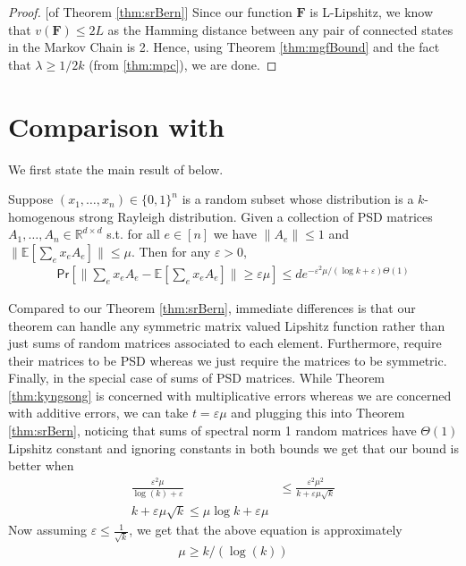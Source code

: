 \begin{proof}{[of Theorem \ref{thm:srBern}]} Since our function $\mathbf{F}$ is L-Lipshitz, we know that $v(\mathbf{F})\leq 2L$ as the Hamming distance between any pair of connected states in the Markov Chain is 2. Hence, using Theorem \ref{thm:mgfBound} and the fact that $\lambda\geq1/{2k}$ (from \ref{thm:mpc}), we are done.
\end{proof}
\section{Comparison with \cite{KyngSong18}}\label{sec:ks}
We first state the main result of \cite{KyngSong18} below.
\begin{theorem}\label{thm:kyngsong} Suppose $(x_1,\ldots,x_n)\in\{0,1\}^n$ is a random subset whose distribution is a $k$-homogenous strong Rayleigh distribution. Given a collection of PSD matrices $A_1,\ldots,A_n\in\mathbb{R}^{d\times d}$ s.t. for all $e \in [n]$ we have $\|A_e\|\leq 1$ and $\|\mathbb{E}[\sum_e x_e A_e]\|\leq\mu$. Then for any $\varepsilon > 0$,
  \begin{align*}
    \mathsf{Pr}[\|\sum_e x_e A_e - \mathbb{E}[\sum_e x_e A_e]\|\geq \varepsilon \mu]\leq de^{-\varepsilon^2\mu/(\log k + \varepsilon) \Theta(1)}
  \end{align*}
\end{theorem}
Compared to our Theorem \ref{thm:srBern}, immediate differences is that our theorem can handle any symmetric matrix valued Lipshitz function rather than just sums of random matrices associated to each element. Furthermore, \cite{KyngSong18} require their matrices to be PSD whereas we just require the matrices to be symmetric. Finally, in the special case of sums of PSD matrices. While Theorem \ref{thm:kyngsong} is concerned with multiplicative errors whereas we are concerned with additive errors, we can take $t=\varepsilon \mu$ and plugging this into Theorem \ref{thm:srBern}, noticing that sums of spectral norm 1 random matrices have $\Theta(1)$ Lipshitz constant and ignoring constants in both bounds we get that our bound is better when
\begin{align*}
  \frac{\varepsilon^2\mu}{\log(k)+\varepsilon}&\leq \frac{\varepsilon^2\mu^2}{k+\varepsilon\mu\sqrt{k}}\\
  k+\varepsilon\mu\sqrt{k}\leq \mu \log k+\varepsilon\mu
\end{align*}
Now assuming $\varepsilon \leq \frac{1}{\sqrt{k}}$, we get that the above equation is approximately
\begin{align*}
  \mu\geq k/(\log(k))
\end{align*}
